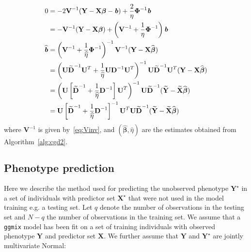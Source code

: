 \documentclass[12pt,letter]{article}\usepackage[]{graphicx}\usepackage[]{color}
\newcommand{\bX}{\textbf{X}}
\newcommand{\bY}{\textbf{Y}}
\newcommand{\bD}{\textbf{D}}
\newcommand{\bXtilde}{\widetilde{\bX}}
\newcommand{\bYtilde}{\widetilde{\bY}}
\newcommand{\bDtilde}{\widetilde{\bD}}
\newcommand{\bU}{\textbf{U}}
\newcommand{\bV}{\textbf{V}}
\newcommand{\bb}{\textbf{\emph{b}}}
\newcommand{\bbeta}{\boldsymbol{\beta}}
\newcommand{\bPhi}{\boldsymbol{\Phi}}
\begin{document}
\begin{align}
	0 & = -2 \bV^{-1} (\bY - \bX \bbeta - \bb) + \frac{2}{\eta} \bPhi^{-1}\bb \nonumber \\
	& = -\bV^{-1}  (\bY - \bX \bbeta ) + \left(\bV^{-1} + \frac{1}{\eta}\bPhi^{-1}\right) \bb  \nonumber\\
	\widehat{\bb} & = \left(\bV^{-1} + \frac{1}{\widehat{\eta}}\bPhi^{-1}\right)^{-1}\bV^{-1}  (\bY - \bX \widehat{\bbeta} ) \nonumber \\
	& = \left(\bU \bDtilde^{-1} \bU^T + \frac{1}{\widehat{\eta}}\bU \bD^{-1} \bU^T\right)^{-1} \bU \bDtilde^{-1} \bU^T (\bY - \bX \widehat{\bbeta} ) \nonumber \\
	& = \left(\bU \left[\bDtilde^{-1} + \frac{1}{\widehat{\eta}} \bD^{-1} \right] \bU^T \right)^{-1} \bU \bDtilde^{-1} (\bYtilde - \bXtilde \widehat{\bbeta} ) \nonumber \\
	& = \bU \left[\bDtilde^{-1} + \frac{1}{\widehat{\eta}} \bD^{-1} \right]^{-1} \bU^T \bU \bDtilde^{-1} (\bYtilde - \bXtilde \widehat{\bbeta} ) \nonumber
\end{align}
where $\bV^{-1}$ is given by~\eqref{eq:Vinv}, and $(\widehat{\bbeta}, \widehat{\eta})$ are the estimates obtained from Algorithm~\ref{alg:cgd2}.



\subsection{Phenotype prediction}

Here we describe the method used for predicting the unobserved phenotype $\bY^\star$ in a set of individuals with predictor set $\bX^\star$ that were not used in the model training e.g. a testing set. Let $q$ denote the number of observations in the testing set and $N-q$ the number of observations in the training set. We assume that a \texttt{ggmix} model has been fit on a set of training individuals with observed phenotype $\bY$ and predictor set $\bX$.  We further assume that $\bY$ and $\bY^\star$ are jointly multivariate Normal:
\end{document}
